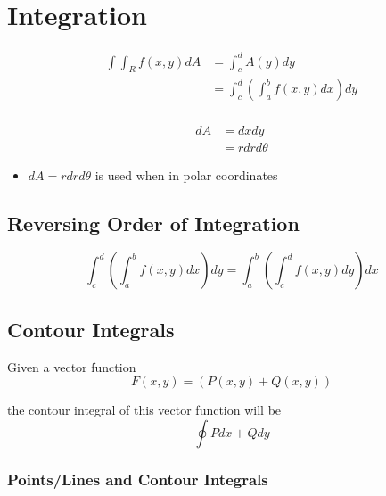 \section{Integration}

  \begin{align*}
    \int \int_{R} f\left( x, y \right) dA
      &= \int_{c}^{d} A\left( y \right) dy \\
      &= \int_{c}^{d} \left( \int_{a}^{b} f\left( x, y \right) dx \right) dy \\
  \end{align*}

  \begin{align}
    dA &= dx dy \\
    &= r dr d\theta
  \end{align}

  \begin{itemize}
    \item $ dA = r dr d\theta $ is used when in polar coordinates
  \end{itemize}

  \subsection{Reversing Order of Integration}

    \begin{equation}
      \int_{c}^{d} \left( \int_{a}^{b} f\left( x, y \right) dx \right) dy
        = \int_{a}^{b} \left( \int_{c}^{d} f\left( x, y \right) dy \right) dx
    \end{equation}

  \subsection{Contour Integrals}

    Given a vector function
    \begin{displaymath}
      F\left( x, y \right) = \left( P\left( x, y \right) + Q\left( x, y \right) \right)
    \end{displaymath}

    the contour integral of this vector function will be
    \begin{equation}
      \oint P dx + Q dy
    \end{equation}

    \subsubsection{Points/Lines and Contour Integrals}

